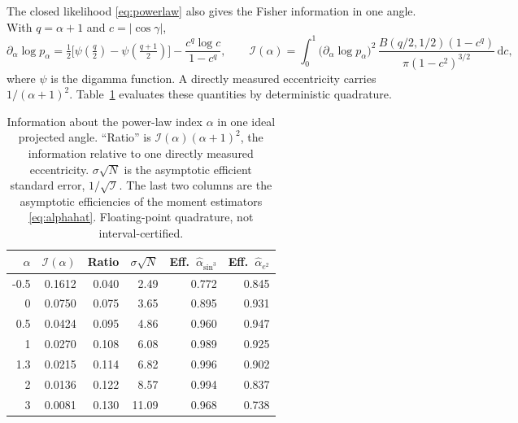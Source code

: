 \documentclass[11pt,a4paper]{article}
\theoremstyle{remark}\newtheorem{remark}[theorem]{Remark}
\newcommand{\dd}{\,\mathrm d}
\begin{document}
The closed likelihood \eqref{eq:powerlaw} also gives the Fisher information in one angle. With $q=\alpha+1$ and $c=|\cos\gamma|$,
\begin{equation}\label{eq:fisher}
\partial_\alpha\log p_\alpha=\tfrac12\big[\psi(\tfrac q2)-\psi(\tfrac{q+1}{2})\big]-\frac{c^q\log c}{1-c^q},
\qquad
\mathcal I(\alpha)=\int_0^1\big(\partial_\alpha\log p_\alpha\big)^2\,\frac{B(q/2,1/2)(1-c^q)}{\pi(1-c^2)^{3/2}}\dd c,
\end{equation}
where $\psi$ is the digamma function. A directly measured eccentricity carries $1/(\alpha+1)^2$. Table~\ref{tab:fisher} evaluates these quantities by deterministic quadrature.

\begin{table}[tb]
\centering
\caption{Information about the power-law index $\alpha$ in one ideal projected angle. ``Ratio'' is $\mathcal I(\alpha)(\alpha+1)^2$, the information relative to one directly measured eccentricity. $\sigma\sqrt N$ is the asymptotic efficient standard error, $1/\sqrt{\mathcal I}$. The last two columns are the asymptotic efficiencies of the moment estimators \eqref{eq:alphahat}. Floating-point quadrature, not interval-certified.}\label{tab:fisher}
\begin{tabular}{rrrrrr}
\toprule
$\alpha$ & $\mathcal I(\alpha)$ & Ratio & $\sigma\sqrt N$ & Eff.\ $\widehat\alpha_{\sin^3}$ & Eff.\ $\widehat\alpha_{e^2}$\\
\midrule
-0.5 & 0.1612 & 0.040 & 2.49 & 0.772 & 0.845\\
0 & 0.0750 & 0.075 & 3.65 & 0.895 & 0.931\\
0.5 & 0.0424 & 0.095 & 4.86 & 0.960 & 0.947\\
1 & 0.0270 & 0.108 & 6.08 & 0.989 & 0.925\\
1.3 & 0.0215 & 0.114 & 6.82 & 0.996 & 0.902\\
2 & 0.0136 & 0.122 & 8.57 & 0.994 & 0.837\\
3 & 0.0081 & 0.130 & 11.09 & 0.968 & 0.738\\
\bottomrule
\end{tabular}
\end{table}
\end{document}
